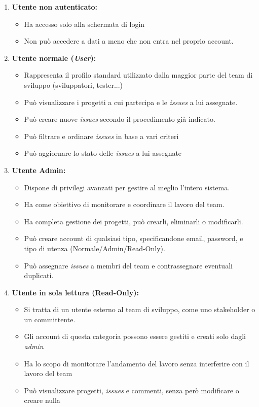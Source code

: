 \begin{enumerate}
	
	\item \textbf{Utente non autenticato:} 
	\begin{itemize}
		\item Ha accesso solo alla schermata di login
		\item Non può accedere a dati a meno che non entra nel proprio account. 
	\end{itemize}
	
	\item \textbf{Utente normale (\textit{User}):} 
	\begin{itemize}
		\item Rappresenta il profilo standard utilizzato dalla maggior parte del team di sviluppo (sviluppatori, tester...)
		\item Può visualizzare i progetti a cui partecipa e le \textit{issues} a lui assegnate.
		\item Può creare nuove \textit{issues} secondo il procedimento già indicato.
		\item Può filtrare e ordinare \textit{issues} in base a vari criteri
		\item Può aggiornare lo stato delle \textit{issues} a lui assegnate
	\end{itemize}
	
	\item \textbf{Utente Admin:} 
	\begin{itemize}
		\item Dispone di privilegi avanzati per gestire al meglio l'intero sistema.
		\item Ha come obiettivo di monitorare e coordinare il lavoro del team.
		\item Ha completa gestione dei progetti, può crearli, eliminarli o modificarli.
		\item Può creare account di qualsiasi tipo, specificandone email, password, e tipo di utenza (Normale/Admin/Read-Only).
		\item Può assegnare \textit{issues} a membri del team e contrassegnare eventuali duplicati.
	\end{itemize}
	
	\item \textbf{Utente in sola lettura (Read-Only):}
	\begin{itemize}
		\item Si tratta di un utente esterno al team di sviluppo, come uno stakeholder o un committente.
		\item Gli account di questa categoria possono essere gestiti e creati solo dagli \textit{admin}
		\item Ha lo scopo di monitorare l'andamento del lavoro senza interferire con il lavoro del team
		\item Può visualizzare progetti, \textit{issues} e commenti, senza però modificare o creare nulla
	\end{itemize}
\end{enumerate}